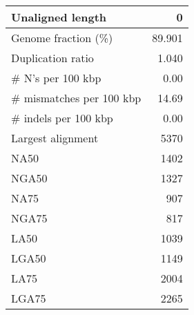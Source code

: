 \documentclass[12pt,a4paper]{article}
\begin{document}
\begin{table}[ht]
\begin{center}
\begin{tabular}{|l*{1}{|r}|}
Unaligned length & 0 \\ \hline
Genome fraction (\%) & 89.901 \\ \hline
Duplication ratio & 1.040 \\ \hline
\# N's per 100 kbp & 0.00 \\ \hline
\# mismatches per 100 kbp & 14.69 \\ \hline
\# indels per 100 kbp & 0.00 \\ \hline
Largest alignment & 5370 \\ \hline
NA50 & 1402 \\ \hline
NGA50 & 1327 \\ \hline
NA75 & 907 \\ \hline
NGA75 & 817 \\ \hline
LA50 & 1039 \\ \hline
LGA50 & 1149 \\ \hline
LA75 & 2004 \\ \hline
LGA75 & 2265 \\ \hline
\end{tabular}
\end{center}
\end{table}
\end{document}
